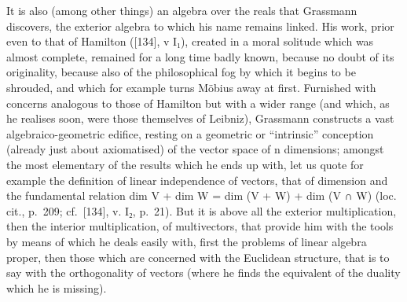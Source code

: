 It is also (among other things) an algebra over the reals that Grassmann discovers, the exterior algebra to which his name remains linked. His work, prior even to that of Hamilton ({[}134{]}, v I₁), created in a moral solitude which was almost complete, remained for a long time badly known, because no doubt of its originality, because also of the philosophical fog by which it begins to be shrouded, and which for example turns Möbius away at first. Furnished with concerns analogous to those of Hamilton but with a wider range (and which, as he realises soon, were those themselves of Leibniz), Grassmann constructs a vast algebraico-geometric edifice, resting on a geometric or ``intrinsic'' conception (already just about axiomatised) of the vector space of n dimensions; amongst the most elementary of the results which he ends up with, let us quote for example the definition of linear independence of vectors, that of dimension and the fundamental relation dim V + dim W = dim (V + W) + dim (V ∩ W) (loc. cit., p.~209; cf.~{[}134{]}, v. I₂, p.~21). But it is above all the exterior multiplication, then the interior multiplication, of multivectors, that provide him with the tools by means of which he deals easily with, first the problems of linear algebra proper, then those which are concerned with the Euclidean structure, that is to say with the orthogonality of vectors (where he finds the equivalent of the duality which he is missing).

